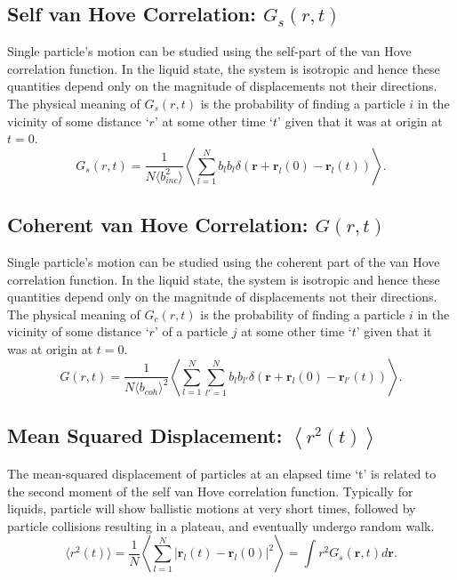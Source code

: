 \documentclass{article}
\begin{document}
\subsection{Self van Hove Correlation: $G_s(r,t)$} \label{sec::Gofrt}
Single particle's motion can be studied using the self-part of the van Hove correlation function. In the liquid state, the system is isotropic and hence these quantities depend only on the magnitude of displacements not their directions. The physical meaning of $G_s(r,t)$ is the probability of finding a particle $i$ in the vicinity of some distance `$r$' at some other time `$t$' given that it was at origin at $t = 0$.
\begin{equation}
\label{eq:gr}
G_s(r,t) = \frac{1}{N\langle b_{inc}^2\rangle}\left\langle\sum\limits_{l=1}^N b_lb_l\delta(\mathbf{r}+\mathbf{r}_l(0)-\mathbf{r}_l(t))\right\rangle.
\end{equation}

\subsection{Coherent van Hove Correlation: $G(r,t)$} \label{sec::Grt}
Single particle's motion can be studied using the coherent part of the van Hove correlation function. In the liquid state, the system is isotropic and hence these quantities depend only on the magnitude of displacements not their directions. The physical meaning of $G_c(r,t)$ is the probability of finding a particle $i$ in the vicinity of some distance `$r$' of a particle $j$ at some other time `$t$' given that it was at origin at $t = 0$.
\begin{equation}
\label{eq:grc}
G(r,t) = \frac{1}{N\langle b_{coh}\rangle^2}\left\langle\sum\limits_{l=1}^N\sum\limits_{l'=1}^N b_lb_{l'}\delta(\mathbf{r}+\mathbf{r}_l(0)-\mathbf{r}_{l'}(t))\right\rangle.
\end{equation}

\subsection{Mean Squared Displacement: $\left<r^2(t)\right>$} \label{sec::MSD}
The mean-squared displacement of particles at an elapsed time `t' is related to the second moment of the self van Hove correlation function. Typically for liquids, particle will show ballistic motions at very short times, followed by particle collisions resulting in a plateau, and eventually undergo random walk.
\begin{equation}
\langle r^2(t)\rangle = \frac{1}{N}\left\langle\sum\limits_{l=1}^N |\mathbf{r}_l(t) - \mathbf{r}_l(0)|^2\right\rangle = \int r^2G_s(\mathbf{r},t)d\mathbf{r}.
\end{equation}
\end{document}
